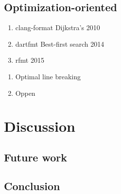 \documentclass[11pt,a4paper]{article}
\begin{document}
\subsection{Optimization-oriented}
\begin{enumerate}
  \item clang-format Dijkstra's 2010
  \item dartfmt Best-first search 2014
  \item rfmt 2015
\end{enumerate}
\begin{enumerate}
  \item Optimal line breaking
  \item Oppen
\end{enumerate}
\section{Discussion}
\subsection{Future work}
\subsection{Conclusion}
\printbibliography{}
\end{document}
